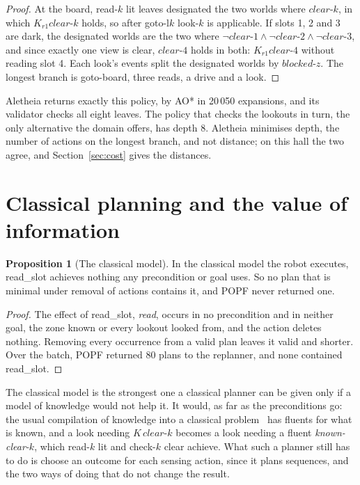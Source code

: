 \documentclass[11pt,a4paper]{article}
\theoremstyle{definition}
\newtheorem{proposition}{Proposition}
\newcommand{\cl}[1]{\mathit{clear\text{-}#1}}
\newcommand{\bz}{\mathit{blocked\text{-}z}}
\newcommand{\act}[1]{\textsf{#1}}
\begin{document}
\begin{proof}
At the board, \act{read-$k$} lit leaves designated the two worlds where $\cl{k}$,
in which $K_{r1}\cl{k}$ holds, so after \act{goto-l$k$} \act{look-$k$} is
applicable. If slots 1, 2 and 3 are dark, the designated worlds are the two
where $\neg\cl{1} \wedge \neg\cl{2} \wedge \neg\cl{3}$, and since exactly one
view is clear, $\cl{4}$ holds in both: $K_{r1}\cl{4}$ without reading slot 4.
Each look's events split the designated worlds by $\bz$. The longest branch is
\act{goto-board}, three reads, a drive and a look.
\end{proof}

\noindent
Aletheia returns exactly this policy, by AO* in 20\,050 expansions,
and its validator checks all eight leaves. The policy that checks the lookouts
in turn, the only alternative the domain offers, has depth 8. Aletheia
minimises depth, the number of actions on the longest branch, and not distance;
on this hall the two agree, and Section~\ref{sec:cost} gives the distances.

\section{Classical planning and the value of information}
\label{sec:classical}

\begin{proposition}[The classical model]
In the classical model the robot executes, \act{read\_slot} achieves nothing
any precondition or goal uses. So no plan that is minimal under removal of
actions contains it, and POPF never returned one.
\end{proposition}

\begin{proof}
The effect of \act{read\_slot}, \textit{read}, occurs in no precondition and
in neither goal, the zone known or every lookout looked from, and the action
deletes nothing. Removing every occurrence from a valid plan leaves it valid
and shorter. Over the batch, POPF returned 80 plans to the replanner,
and none contained \act{read\_slot}.
\end{proof}

\noindent
The classical model is the strongest one a classical planner can be given only
if a model of knowledge would not help it. It would, as far as the
preconditions go: the usual compilation of knowledge into a classical
problem~\cite{pg2009} has fluents for what is known, and a look needing
$K\,\cl{k}$ becomes a look needing a fluent \textit{known-clear-$k$}, which
\act{read-$k$} lit and \act{check-$k$} clear achieve. What such a planner
still has to do is choose an outcome for each sensing action, since it plans
sequences, and the two ways of doing that do not change the result.
\end{document}
